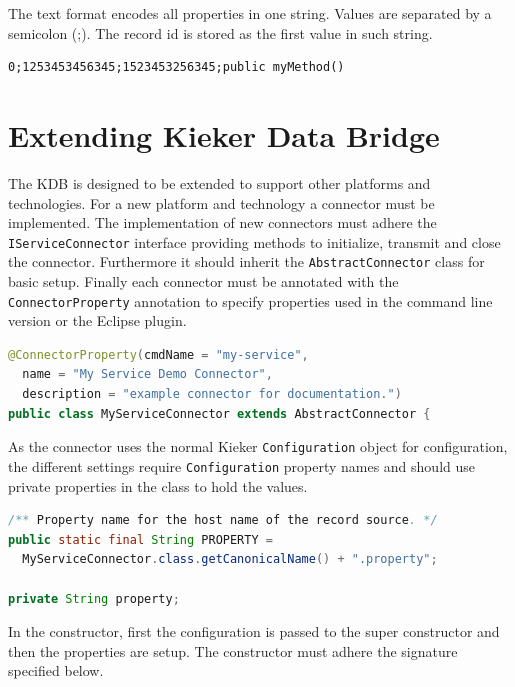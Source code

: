 \documentclass[11pt,a4paper]{article}
\begin{document}
The text format encodes all properties in one string. Values are separated by a semicolon (;). The record id is stored as the first value in such string.

\begin{verbatim}
0;1253453456345;1523453256345;public myMethod()
\end{verbatim}


\section{Extending Kieker Data Bridge}\label{s:extension}

The KDB is designed to be extended to support other platforms and technologies. For a new platform and technology a connector must be implemented. The implementation of new connectors must adhere the \texttt{IServiceConnector} interface providing methods to initialize, transmit and close the connector. Furthermore it should inherit the \texttt{AbstractConnector} class for basic setup. Finally each connector must be annotated with the \texttt{ConnectorProperty} annotation to specify properties used in the command line version or the Eclipse plugin.

\begin{lstlisting}[language=Java,caption=Example connector declaration]
@ConnectorProperty(cmdName = "my-service",
  name = "My Service Demo Connector",
  description = "example connector for documentation.")
public class MyServiceConnector extends AbstractConnector {
\end{lstlisting}

\noindent As the connector uses the normal Kieker \texttt{Configuration} object for configuration, the different settings require \texttt{Configuration} property names and should use private properties in the class to hold the values.

\begin{lstlisting}[language=Java,caption=Example constant for connector configuration and its accompanying property declaration]
/** Property name for the host name of the record source. */
public static final String PROPERTY =
  MyServiceConnector.class.getCanonicalName() + ".property";

private String property;
\end{lstlisting}

\noindent In the constructor, first the configuration is passed to the super constructor and then the properties are setup. The constructor must adhere the signature specified below.
\end{document}
